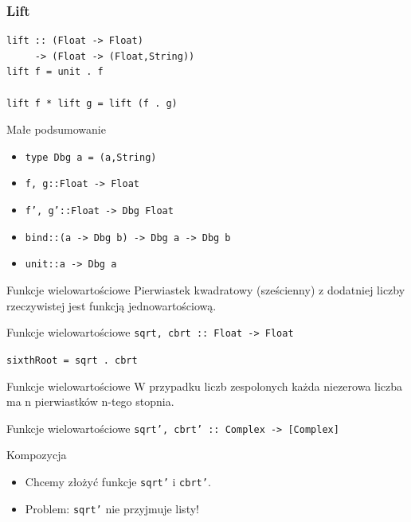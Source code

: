 \documentclass[14pt]{beamer}
\begin{document}
\begin{frame}[fragile]
\frametitle{Lift}
\begin{verbatim}
lift :: (Float -> Float)
     -> (Float -> (Float,String))
lift f = unit . f

lift f * lift g = lift (f . g)
\end{verbatim}
\end{frame}

\begin{frame}{Małe podsumowanie}
    \begin{itemize}
        \item \texttt{type Dbg a = (a,String)}
        \item \texttt{f, g::Float -> Float}
        \item \texttt{f', g'::Float -> Dbg Float}
        \item \texttt{bind::(a -> Dbg b) -> Dbg a -> Dbg b}
        \item \texttt{unit::a -> Dbg a}
    \end{itemize}
\end{frame}


\begin{frame}{Funkcje wielowartościowe}
    Pierwiastek kwadratowy (sześcienny) z dodatniej liczby rzeczywistej
    jest funkcją jednowartościową.
\end{frame}

\begin{frame}{Funkcje wielowartościowe}
    \texttt{sqrt, cbrt :: Float -> Float}
    \pause

    \texttt{sixthRoot = sqrt . cbrt}
\end{frame}

\begin{frame}{Funkcje wielowartościowe}
    W przypadku liczb zespolonych każda niezerowa liczba ma n pierwiastków
    n-tego stopnia.
\end{frame}

\begin{frame}{Funkcje wielowartościowe}
    \texttt{sqrt', cbrt' :: Complex -> [Complex]}
\end{frame}

\begin{frame}{Kompozycja}
    \begin{itemize}
        \item Chcemy złożyć funkcje \texttt{sqrt'} i \texttt{cbrt'}.
        \item Problem: \texttt{sqrt'} nie przyjmuje listy!
    \end{itemize}
\end{frame}
\end{document}
